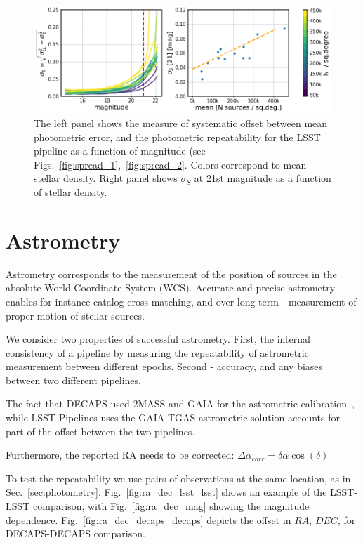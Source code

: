 \documentclass[DM,lsstdraft,toc,usenatbib]{lsstdoc}
\begin{document}
\begin{figure}
\begin{centering}
\includegraphics[width=0.8\columnwidth]{figs/photometric_offset_combined.png}
\caption{The left panel shows the measure of systematic offset between mean photometric error, and the photometric repeatability for the LSST pipeline as a function of magnitude (see Figs.~\ref{fig:spread_1},~\ref{fig:spread_2}. Colors correspond to mean stellar density. Right panel shows $\sigma_{S}$ at 21st magnitude  as a function of stellar density.}
\label{fig:spread_summary}
\end{centering}
\end{figure} 



\section{Astrometry}
Astrometry corresponds to the measurement of the position of sources in the absolute World Coordinate System (WCS). Accurate and precise astrometry enables for instance catalog cross-matching, and over long-term - measurement of proper motion of stellar sources. 

We consider two properties of successful astrometry. First, the internal consistency of a pipeline by measuring the repeatability of astrometric measurement between different epochs.  Second - accuracy, and any biases between two different pipelines. 

The fact that DECAPS used 2MASS and GAIA for the astrometric calibration~\cite{schlafly2017}, while LSST Pipelines uses the GAIA-TGAS astrometric solution accounts for part of the offset between the two pipelines. 

Furthermore, the reported RA needs to be corrected:  $\Delta \alpha_{corr} = \delta \alpha \cos{(\delta)}$

To test the repeatability we use pairs of observations at the same location, as in Sec.~\ref{sec:photometry}. Fig.~\ref{fig:ra_dec_lsst_lsst} shows an example of the LSST-LSST comparison, with Fig.~\ref{fig:ra_dec_mag} showing the magnitude dependence. Fig.~\ref{fig:ra_dec_decaps_decaps} depicts the offset in $RA$, $DEC$, for DECAPS-DECAPS comparison. 
\end{document}
